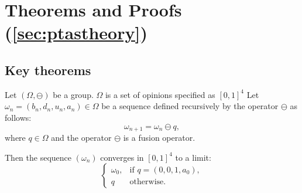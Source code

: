 



   





\section{Theorems and Proofs (\cref{sec:ptastheory})}\label{app:proof}
\subsection{Key theorems}
\begin{theorem}\label{thm:arithm}
Let $(\Omega, \ominus)$ be a group. \(\Omega\) is a set of opinions specified as \([0,1]^4\)
Let $\omega_n = (b_n, d_n, u_n, a_n) \in \Omega$ be a sequence defined recursively by the operator $\ominus$ as follows:
\[
\omega_{n+1} = \omega_n \ominus q,
\]
where \(q\in \Omega\) and the operator $\ominus$ is a fusion operator.

Then the sequence $(\omega_n)$ converges in $[0,1]^4$ to a limit:
\[
\begin{cases}
\omega_0, & \text{if } q = (0, 0, 1, a_0), \\
q & \text{otherwise}.
\end{cases}
\]

\end{theorem}

